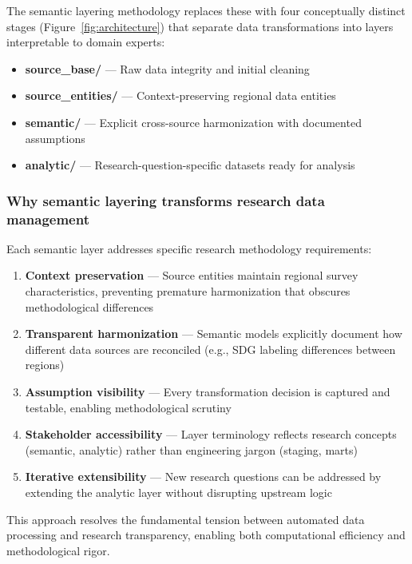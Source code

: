 \documentclass{article}
\begin{document}
The semantic layering methodology replaces these with four conceptually distinct stages (Figure~\ref{fig:architecture}) that separate  data transformations into layers interpretable to domain experts:

\begin{itemize}
    \item \textbf{source\_base/} — Raw data integrity and initial cleaning
    \item \textbf{source\_entities/} — Context-preserving regional data entities
    \item \textbf{semantic/} — Explicit cross-source harmonization with documented assumptions
    \item \textbf{analytic/} — Research-question-specific datasets ready for analysis
\end{itemize}

\subsubsection{Why semantic layering transforms research data management}
\label{subsubsec:semantic-benefits}

Each semantic layer addresses specific research methodology requirements:

\begin{enumerate}
    \item \textbf{Context preservation} — Source entities maintain regional survey characteristics, preventing premature harmonization that obscures methodological differences
    \item \textbf{Transparent harmonization} — Semantic models explicitly document how different data sources are reconciled (e.g., SDG labeling differences between regions)
    \item \textbf{Assumption visibility} — Every transformation decision is captured and testable, enabling methodological scrutiny
    \item \textbf{Stakeholder accessibility} — Layer terminology reflects research concepts (semantic, analytic) rather than engineering jargon (staging, marts)
    \item \textbf{Iterative extensibility} — New research questions can be addressed by extending the analytic layer without disrupting upstream logic
\end{enumerate}

This approach resolves the fundamental tension between automated data processing and research transparency, enabling both computational efficiency and methodological rigor.
\end{document}

